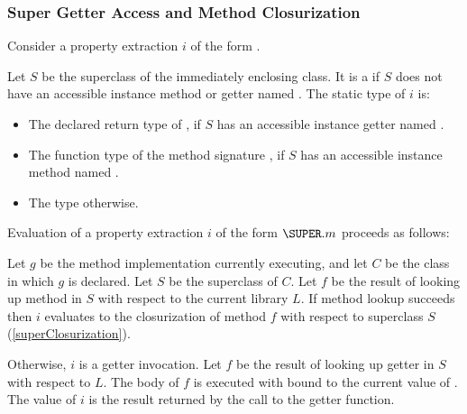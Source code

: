 \documentclass[makeidx]{article}
\begin{document}
{\subsubsection{Super Getter Access and Method Closurization}

\LMHash{}%
Consider a property extraction $i$ of the form .

\LMHash{}%
Let $S$ be the superclass of the immediately enclosing class.
It is a  if $S$ does not have
an accessible instance method or getter named \id.
The static type of $i$ is:

\begin{itemize}
\item The declared return type of ,
  if $S$ has an accessible instance getter named \id.
\item The function type of the method signature ,
  if $S$ has an accessible instance method named \id.
\item The type \DYNAMIC{} otherwise.
\end{itemize}


\LMHash{}%
Evaluation of a property extraction $i$ of the form $\SUPER.m$
proceeds as follows:

\LMHash{}%
Let $g$ be the method implementation currently executing,
and let $C$ be the class in which $g$ is declared.
Let $S$ be the superclass of $C$.
Let $f$ be the result of looking up method \id{} in $S$
with respect to the current library $L$.
If method lookup succeeds then $i$ evaluates to
the closurization of method $f$
with respect to superclass $S$
(\ref{superClosurization}).

\LMHash{}%
Otherwise, $i$ is a getter invocation.
Let $f$ be the result of looking up
getter \id{} in $S$ with respect to $L$.
The body of $f$ is executed with \THIS{} bound to the current value of \THIS.
The value of $i$ is the result returned by the call to the getter function.



}
\end{document}
